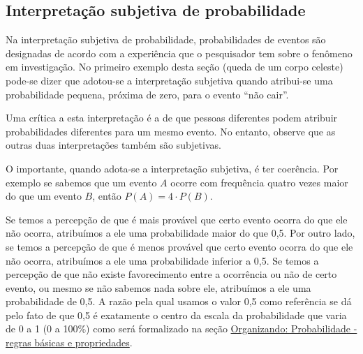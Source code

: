\subsection{Interpretação subjetiva de probabilidade}

Na interpretação subjetiva de probabilidade, probabilidades de eventos são designadas de acordo com a experiência que o pesquisador tem sobre o fenômeno em investigação. No primeiro exemplo desta seção (queda de um corpo celeste) pode-se dizer que adotou-se a interpretação subjetiva quando atribui-se uma probabilidade pequena, próxima de zero, para o evento “não cair”.

Uma crítica a esta interpretação é a de que pessoas diferentes podem atribuir probabilidades diferentes para um mesmo evento. No entanto, observe que as outras duas interpretações também são subjetivas.

O importante, quando adota-se a interpretação subjetiva, é ter coerência. Por exemplo se sabemos que um evento \(A\) ocorre com frequência quatro vezes maior do que um evento \(B\), então \(P(A)=4\cdot P(B)\).

Se temos a percepção de que é mais provável que certo evento ocorra do que ele não ocorra, atribuímos a ele uma probabilidade maior do que 0,5. Por outro lado, se temos a percepção de que é menos provável que certo evento ocorra do que ele não ocorra, atribuímos a ele uma probabilidade inferior a 0,5. Se temos a percepção de que não existe favorecimento entre a ocorrência ou não de certo evento, ou mesmo se não sabemos nada sobre ele, atribuímos a ele uma probabilidade de 0,5. A razão pela qual usamos o valor 0,5 como referência se dá pelo fato de que 0,5 é exatamente o centro da escala da probabilidade que varia de 0 a 1 (0 a 100\%) como será formalizado na seção \hyperref[regrasbasicaspropriedades]{Organizando: Probabilidade - regras básicas e propriedades}.

